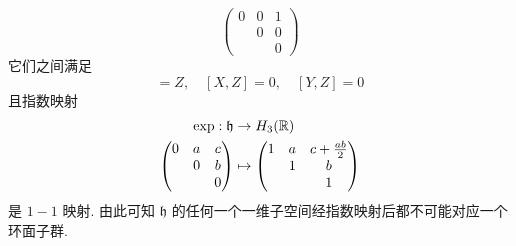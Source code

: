 \begin{example}
\begin{equation*}
\begin{pmatrix}
                    0 & 0 & 1 \\
                      & 0 & 0 \\
                      &   & 0
                \end{pmatrix}
            \end{equation*}
            它们之间满足
            \begin{equation*}
                [X,Y]=Z,\quad[X,Z]=0,\quad[Y,Z]=0
            \end{equation*}
            且指数映射
            \begin{align*}
                \exp:\mathfrak{h}&\rightarrow H_3(\mathbb{R}) \\
                \begin{pmatrix}
                    0 & a & c \\
                      & 0 & b \\
                      &   & 0
                \end{pmatrix}&\mapsto
                \begin{pmatrix}
                    1 & a & c+\frac{ab}{2} \\
                      & 1 & b \\
                      &   & 1
                \end{pmatrix}
            \end{align*}
            是 $1-1$ 映射. 由此可知 $\mathfrak{h}$ 的任何一个一维子空间经指数映射后都不可能对应一个环面子群.
        \end{example}
    